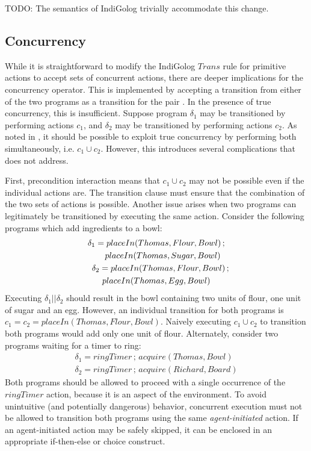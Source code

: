 TODO: The semantics of IndiGolog trivially accommodate this change.


\subsection{Concurrency}

While it is straightforward to modify the IndiGolog $Trans$ rule
for primitive actions to accept sets of concurrent actions, there
are deeper implications for the concurrency operator. This is implemented
by accepting a transition from either of the two programs as a transition
for the pair \citet{giacomo00congolog}. In the presence of true concurrency,
this is insufficient. Suppose program $\delta_{1}$ may be transitioned
by performing actions $c_{1}$, and $\delta_{2}$ may be transitioned
by performing actions $c_{2}$. As noted in \citet{pinto99tcongolog},
it should be possible to exploit true concurrency by performing both
simultaneously, i.e. $c_{1}\cup c_{2}$. However, this introduces
several complications that \citet{pinto99tcongolog} does not address.

First, precondition interaction means that $c_{1}\cup c_{2}$ may
not be possible even if the individual actions are. The transition
clause must ensure that the combination of the two sets of actions
is possible. Another issue arises when two programs can legitimately
be transitioned by executing the same action. Consider the following
programs which add ingredients to a bowl:\begin{multline*}
\delta_{1}=placeIn(Thomas,Flour,Bowl)\,;\\
\shoveright{placeIn(Thomas,Sugar,Bowl)}\\
\shoveleft{\delta_{2}=placeIn(Thomas,Flour,Bowl)\,;}\\
placeIn(Thomas,Egg,Bowl)\end{multline*}
 Executing $\delta_{1}||\delta_{2}$ should result in the bowl containing
two units of flour, one unit of sugar and an egg. However, an individual
transition for both programs is $c_{1}=c_{2}=placeIn(Thomas,Flour,Bowl)$.
Naively executing $c_{1}\cup c_{2}$ to transition both programs would
add only one unit of flour. Alternately, consider two programs waiting
for a timer to ring:\begin{gather*}
\delta_{1}=ringTimer\,;\, acquire(Thomas,Bowl)\\
\delta_{2}=ringTimer\,;\, acquire(Richard,Board)\end{gather*}
 Both programs should be allowed to proceed with a single occurrence
of the $ringTimer$ action, because it is an aspect of the environment.
To avoid unintuitive (and potentially dangerous) behavior, concurrent
execution must not be allowed to transition both programs using the
same \emph{agent-initiated} action. If an agent-initiated action may
be safely skipped, it can be enclosed in an appropriate if-then-else
or choice construct.

